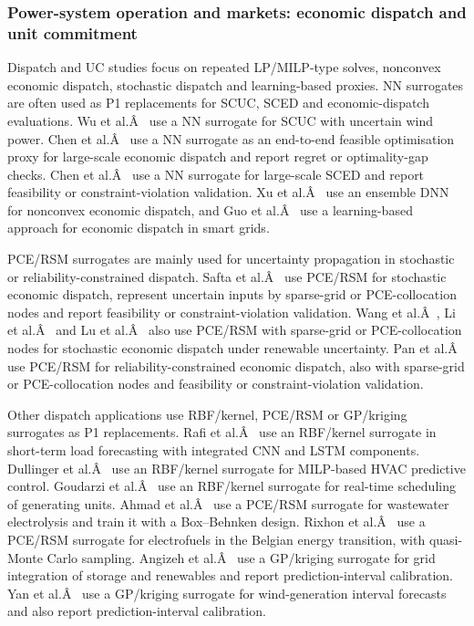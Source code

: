 \subsubsection{Power-system operation and markets: economic dispatch and unit commitment}
\label{sec:apps:dispatch}

Dispatch and UC studies focus on repeated LP/MILP-type solves, nonconvex
economic dispatch, stochastic dispatch and learning-based proxies. NN
surrogates are often used as P1 replacements for SCUC, SCED and
economic-dispatch evaluations. Wu et al.Â~\cite{Wu2022231} use a NN surrogate
for SCUC with uncertain wind power. Chen et al.Â~\cite{Chen20244723} use a NN
surrogate as an end-to-end feasible optimisation proxy for large-scale
economic dispatch and report regret or optimality-gap checks. Chen et
al.Â~\cite{Chen2022} use a NN surrogate for large-scale SCED and report
feasibility or constraint-violation validation. Xu et al.Â~\cite{Xu20223066}
use an ensemble DNN for nonconvex economic dispatch, and Guo et
al.Â~\cite{Guo202115024} use a learning-based approach for economic dispatch
in smart grids.

PCE/RSM surrogates are mainly used for uncertainty propagation in
stochastic or reliability-constrained dispatch. Safta et
al.Â~\cite{Safta20172535} use PCE/RSM for stochastic economic dispatch,
represent uncertain inputs by sparse-grid or PCE-collocation nodes and
report feasibility or constraint-violation validation. Wang et
al.Â~\cite{Wang2022812}, Li et al.Â~\cite{Li20191438} and Lu et al.Â~\cite{Lu201991827}
also use PCE/RSM with sparse-grid or PCE-collocation nodes for
stochastic economic dispatch under renewable uncertainty. Pan et
al.Â~\cite{Pan20244422} use PCE/RSM for reliability-constrained economic
dispatch, also with sparse-grid or PCE-collocation nodes and feasibility
or constraint-violation validation.

Other dispatch applications use RBF/kernel, PCE/RSM or GP/kriging
surrogates as P1 replacements. Rafi et al.Â~\cite{Rafi202132436} use an
RBF/kernel surrogate in short-term load forecasting with integrated CNN
and LSTM components. Dullinger et al.Â~\cite{Dullinger20181646} use an
RBF/kernel surrogate for MILP-based HVAC predictive control. Goudarzi et
al.Â~\cite{Goudarzi2017667} use an RBF/kernel surrogate for real-time
scheduling of generating units. Ahmad et al.Â~\cite{Ahmad202451} use a
PCE/RSM surrogate for wastewater electrolysis and train it with a
Box--Behnken design. Rixhon et al.Â~\cite{Rixhon2021} use a PCE/RSM surrogate
for electrofuels in the Belgian energy transition, with quasi-Monte
Carlo sampling. Angizeh et al.Â~\cite{Angizeh2023134995} use a GP/kriging
surrogate for grid integration of storage and renewables and report
prediction-interval calibration. Yan et al.Â~\cite{Yan2019625} use a
GP/kriging surrogate for wind-generation interval forecasts and also
report prediction-interval calibration.

